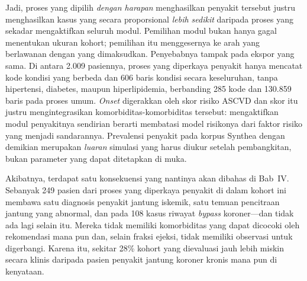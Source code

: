 Jadi, proses yang dipilih \emph{dengan harapan} menghasilkan penyakit tersebut justru menghasilkan kasus yang secara
proporsional \emph{lebih sedikit} daripada proses yang sekadar mengaktifkan seluruh modul.
Pemilihan modul bukan hanya gagal menentukan ukuran kohort; pemilihan itu menggesernya ke arah
yang berlawanan dengan yang dimaksudkan. Penyebabnya tampak pada ekspor yang sama. Di antara
2{.}009 pasiennya, proses yang diperkaya penyakit hanya mencatat kode kondisi
yang berbeda dan 606 baris kondisi secara keseluruhan, tanpa
hipertensi, diabetes, maupun hiperlipidemia, berbanding 285 kode dan
130.859 baris pada proses umum. \emph{Onset} digerakkan oleh skor risiko ASCVD dan skor
itu justru mengintegrasikan komorbiditas-komorbiditas tersebut: mengaktifkan modul penyakitnya
sendirian berarti membatasi model risikonya dari faktor risiko yang menjadi sandarannya.
Prevalensi penyakit pada korpus Synthea dengan demikian merupakan \emph{luaran} simulasi yang
harus diukur setelah pembangkitan, bukan parameter yang dapat ditetapkan di muka.

Akibatnya, terdapat satu konsekuensi yang nantinya akan dibahas di Bab~IV. Sebanyak 249
pasien dari proses yang diperkaya penyakit di dalam kohort ini membawa satu diagnosis penyakit
jantung iskemik, satu temuan pencitraan jantung yang abnormal, dan pada 108 kasus
riwayat \emph{bypass} koroner---dan tidak ada lagi selain itu. Mereka tidak memiliki komorbiditas
yang dapat dicocoki oleh rekomendasi mana pun dan, selain fraksi ejeksi, tidak memiliki
observasi untuk digerbangi. Karena itu, sekitar 28\% kohort yang dievaluasi jauh lebih miskin
secara klinis daripada pasien penyakit jantung koroner kronis mana pun di kenyataan.

